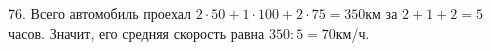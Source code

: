 76. Всего автомобиль проехал $2\cdot50+1\cdot100+2\cdot75=350$км за $2+1+2=5$ часов. Значит, его средняя скорость равна $350:5=70$км/ч.\\
